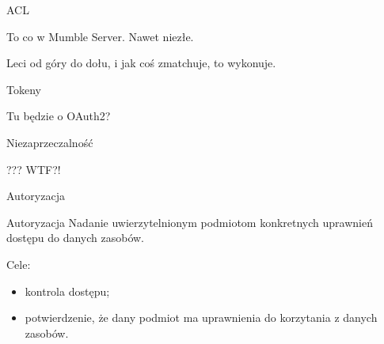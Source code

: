 \begin{frame}{ACL}
	
	To co w Mumble Server. Nawet niezłe.
	
	Leci od góry do dołu, i jak coś zmatchuje, to wykonuje.
	
\end{frame}

\begin{frame}{Tokeny}
	
	Tu będzie o OAuth2?
	
\end{frame}

\begin{frame}{Niezaprzeczalność}
	
	??? WTF?!
	
\end{frame}

\begin{frame}{Autoryzacja}
	
	\begin{alertblock}{Autoryzacja}
		Nadanie uwierzytelnionym podmiotom konkretnych uprawnień dostępu do danych zasobów.
	\end{alertblock}
	
	Cele:
	\begin{itemize}
		\item kontrola dostępu;
		\item potwierdzenie, że dany podmiot ma uprawnienia do korzytania z danych zasobów.
	\end{itemize}
	
\end{frame}
